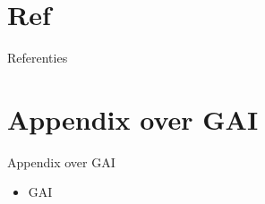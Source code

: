 \documentclass{beamer}
\begin{document}
\section{Ref}
\begin{frame}{Referenties}
\end{frame}

\section[Appendix]{Appendix over GAI}
\begin{frame}{Appendix over GAI}
    \begin{itemize}
        \item GAI
    \end{itemize}
\end{frame}
\end{document}
